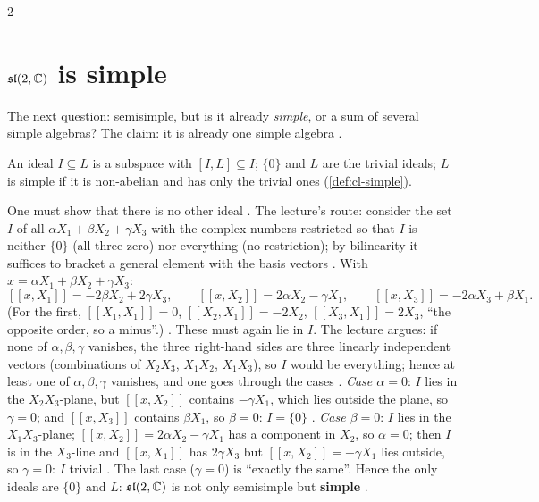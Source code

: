 \begin{paracol}{2}
\section{$\mathfrak{sl}(2,\mathbb{C})$ is simple}\label{sec:sa-simple}

The next question: semisimple, but is it already \emph{simple}, or a sum of several simple algebras? The claim: it is already one simple algebra .
\begin{recall}
An ideal $I\subseteq L$ is a subspace with $[I,L]\subseteq I$; $\{0\}$ and $L$ are the trivial ideals; $L$ is simple if it is non-abelian and has only the trivial ones (\cref{def:cl-simple}).
\end{recall}
One must show that there is no other ideal      . The lecture's route: consider the set $I$ of all $\alpha X_1+\beta X_2+\gamma X_3$ with the complex numbers restricted so that $I$ is neither $\{0\}$ (all three zero) nor everything (no restriction); by bilinearity it suffices to bracket a general element with the basis vectors      . With $x=\alpha X_1+\beta X_2+\gamma X_3$:
\[
  [\![x,X_1]\!]=-2\beta X_2+2\gamma X_3,\qquad
  [\![x,X_2]\!]=2\alpha X_2-\gamma X_1,\qquad
  [\![x,X_3]\!]=-2\alpha X_3+\beta X_1 .
\]
(For the first, $[\![X_1,X_1]\!]=0$, $[\![X_2,X_1]\!]=-2X_2$, $[\![X_3,X_1]\!]=2X_3$, ``the opposite order, so a minus''.)    . These must again lie in $I$. The lecture argues: if none of $\alpha,\beta,\gamma$ vanishes, the three right-hand sides are three linearly independent vectors (combinations of $X_2X_3$, $X_1X_2$, $X_1X_3$), so $I$ would be everything; hence at least one of $\alpha,\beta,\gamma$ vanishes, and one goes through the cases       . \emph{Case $\alpha=0$}: $I$ lies in the $X_2X_3$-plane, but $[\![x,X_2]\!]$ contains $-\gamma X_1$, which lies outside the plane, so $\gamma=0$; and $[\![x,X_3]\!]$ contains $\beta X_1$, so $\beta=0$: $I=\{0\}$   . \emph{Case $\beta=0$}: $I$ lies in the $X_1X_3$-plane; $[\![x,X_2]\!]=2\alpha X_2-\gamma X_1$ has a component in $X_2$, so $\alpha=0$; then $I$ is in the $X_3$-line and $[\![x,X_1]\!]$ has $2\gamma X_3$ but $[\![x,X_2]\!]=-\gamma X_1$ lies outside, so $\gamma=0$: $I$ trivial   . The last case ($\gamma=0$) is ``exactly the same''. Hence the only ideals are $\{0\}$ and $L$: $\mathfrak{sl}(2,\mathbb{C})$ is not only semisimple but \textbf{simple}  .

\end{paracol}

